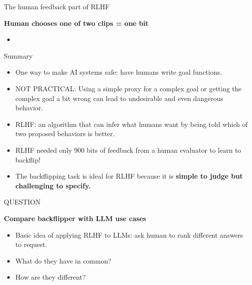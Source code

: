 \begin{vbframe}{The human feedback part of RLHF}

\vfill

\textbf{Human chooses one of two clips = one bit}

	\begin{itemize}
		\item \href{https://player.vimeo.com/video/754042470?h=e64a40690d&badge=0&autopause=0&player_id=0&app_id=58479}{}

	\end{itemize}

\vfill

\end{vbframe}



\begin{vbframe}{Summary}

\vfill

\textbf{}

	\begin{itemize}
		\item One way to make  AI
		systems safe: have humans 
		write goal functions.
		\item NOT PRACTICAL: Using a simple
		proxy for a complex goal or getting the
		complex goal a bit wrong can lead to
		undesirable and even dangerous behavior.
                \item
		RLHF: an algorithm that can infer
		what humans want by being told which of two
		proposed behaviors is better.
\item RLHF needed only 900 bits of feedback from a human
		evaluator to learn to backflip!
                \item The backflipping task is ideal
                for RLHF
       because it         is \textbf{simple to judge but challenging
	to specify.}
	\end{itemize}

\vfill

\end{vbframe}

\begin{vbframe}{QUESTION}

\vfill

\textbf{Compare backflipper with LLM use cases}

	\begin{itemize}
        \item Basic idea of applying RLHF to LLMs: ask human
        to rank different answers to request.
		\item What do they have in common?
                \item How are they different?

	\end{itemize}

\vfill

\end{vbframe}



